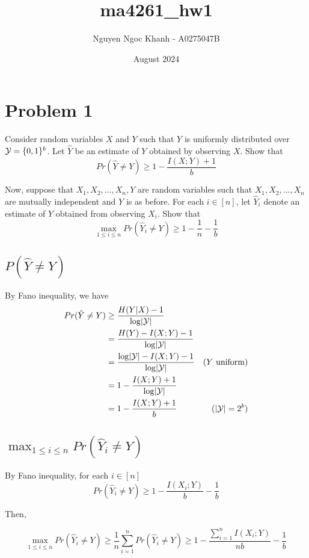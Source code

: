 \documentclass{article}
\title{ma4261\_hw1}
\author{Nguyen Ngoc Khanh - A0275047B}
\date{August 2024}
\begin{document}
\maketitle

\section{Problem 1}
Consider random variables $X$ and $Y$ such that $Y$ is uniformly distributed over $\mathcal{Y} = \{0, 1\}^b$. Let $\hat{Y}$ be an estimate of $Y$ obtained by observing $X$. Show that
$$
    Pr(\hat{Y} \neq Y) \geq 1 - \frac{I(X; Y) + 1}{b}
$$

Now, suppose that $X_1, X_2, ..., X_n, Y$ are random variables such that $X_1, X_2, ..., X_n$ are mutually independent and $Y$ is as before. For each $i \in [n]$, let $\hat{Y}_i$ denote an estimate of $Y$ obtained from observing $X_i$. Show that
$$
    \max_{1 \leq i \leq n} Pr(\hat{Y}_i \neq Y) \geq 1 - \frac{1}{n} - \frac{1}{b}
$$

\subsection{$P(\hat{Y} \neq Y)$}

By Fano inequality, we have
\begin{align*}
    Pr(\hat{Y} \neq Y)
    &\geq \frac{H(Y|X) - 1}{\log \lvert\mathcal{Y}\rvert} \\
    &= \frac{H(Y) - I(X; Y) - 1}{\log \lvert\mathcal{Y}\rvert} \\
    &= \frac{\log \lvert\mathcal{Y}\rvert - I(X; Y) - 1}{\log \lvert\mathcal{Y}\rvert} &\text{($Y$ uniform)}\\
    &= 1 - \frac{I(X; Y) + 1}{\log \lvert\mathcal{Y}\rvert} \\
    &= 1 - \frac{I(X; Y) + 1}{b} &\text{($\lvert\mathcal{Y}\rvert = 2^b$)} \\
\end{align*}

\subsection{$\max_{1 \leq i \leq n} Pr(\hat{Y}_i \neq Y)$}

By Fano inequality, for each $i \in [n]$
$$
    Pr(\hat{Y}_i \neq Y) \geq 1 - \frac{I(X_i; Y)}{b} - \frac{1}{b}
$$

Then,

$$
    \max_{1 \leq i \leq n} Pr(\hat{Y}_i \neq Y) \geq \frac{1}{n} \sum_{i=1}^n Pr(\hat{Y}_i \neq Y) \geq 1 - \frac{\sum_{i=1}^n I(X_i; Y)}{nb} - \frac{1}{b}
$$
\end{document}
